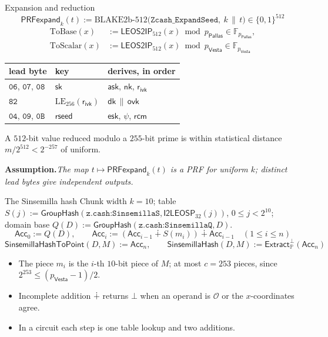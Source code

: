 \documentclass[aspectratio=169,11pt]{beamer}
\newcommand{\F}{\mathbb{F}}
\newcommand{\nksym}{\ensuremath{\mathsf{nk}}}
\newcommand{\asksym}{\ensuremath{\mathsf{ask}}}
\newcommand{\ovk}{\ensuremath{\mathsf{ovk}}}
\newcommand{\dk}{\ensuremath{\mathsf{dk}}}
\newcommand{\rcm}{\ensuremath{\mathsf{rcm}}}
\newcommand{\rivk}{\ensuremath{\mathsf{r_{ivk}}}}
\newcommand{\esk}{\ensuremath{\mathsf{esk}}}
\newcommand{\Extract}{\ensuremath{\mathsf{Extract}}}
\newcommand{\GroupHash}{\ensuremath{\mathsf{GroupHash}}}
\newcommand{\PP}{\mathbb{P}}
\newcommand{\pP}{p_{\mathsf{Pallas}}}
\newcommand{\pV}{p_{\mathsf{Vesta}}}
\newcommand{\FP}{\F_{\pP}}
\newcommand{\FV}{\F_{\pV}}
\newcommand{\Ext}{\Extract_{\PP}}
\newcommand{\sksym}{\mathsf{sk}}
\newcommand{\PRFx}[1]{\mathsf{PRFexpand}_{#1}}
\newcommand{\LE}[1]{\mathrm{LE}_{#1}}
\newcommand{\Ilep}[1]{\mathsf{I2LEOSP}_{#1}}
\newcommand{\SinHash}{\mathsf{SinsemillaHash}}
\newcommand{\SinPt}{\mathsf{SinsemillaHashToPoint}}
\newcommand{\rseed}{\mathsf{rseed}}
\newcommand{\stmt}[2]{\par\smallskip\noindent\textbf{#1}\enspace\textit{#2}\par}
\begin{document}
\begin{frame}{Expansion and reduction}
\[
\PRFx{k}(t) := \mathrm{BLAKE2b\text{-}512}\bigl(\texttt{Zcash\_ExpandSeed},\ k \,\|\, t\bigr) \in \{0,1\}^{512}
\]
\begin{align*}
\mathrm{ToBase}(x) &:= \mathsf{LEOS2IP}_{512}(x) \bmod \pP \in \FP, \\
\mathrm{ToScalar}(x) &:= \mathsf{LEOS2IP}_{512}(x) \bmod \pV \in \FV
\end{align*}
\vfill
\small
\begin{center}
\begin{tabular}{@{}lll@{}}
\toprule
lead byte & key & derives, in order \\
\midrule
$\mathtt{06}$, $\mathtt{07}$, $\mathtt{08}$ & $\sksym$ & $\asksym$, $\nksym$, $\rivk$ \\
$\mathtt{82}$ & $\LE{256}(\rivk)$ & $\dk \,\|\, \ovk$ \\
$\mathtt{04}$, $\mathtt{09}$, $\mathtt{0B}$ & $\rseed$ & $\esk$, $\psi$, $\rcm$ \\
\bottomrule
\end{tabular}
\end{center}
\vfill
A $512$-bit value reduced modulo a $255$-bit prime is within statistical
distance $m/2^{512} < 2^{-257}$ of uniform.
\stmt{Assumption.}{The map $t \mapsto \PRFx{k}(t)$ is a PRF for uniform $k$; distinct lead bytes give independent outputs.}
\end{frame}

\begin{frame}{The Sinsemilla hash}
Chunk width $k = 10$; table $S(j) := \GroupHash(\texttt{z.cash:SinsemillaS}, \Ilep{32}(j))$, $0 \le j < 2^{10}$;
domain base $Q(D) := \GroupHash(\texttt{z.cash:SinsemillaQ}, D)$.
\[
\mathsf{Acc}_0 := Q(D),\qquad
\mathsf{Acc}_i := (\mathsf{Acc}_{i-1} \dotplus S(m_i)) \dotplus \mathsf{Acc}_{i-1}
\quad (1 \le i \le n)
\]
\[
\SinPt(D, M) := \mathsf{Acc}_n,\qquad
\SinHash(D, M) := \Ext^{\bot}(\mathsf{Acc}_n)
\]
\vfill
\begin{itemize}\itemsep4pt
\item The piece $m_i$ is the $i$-th $10$-bit piece of $M$; at most $c = 253$ pieces, since $2^{253} \le (\pV - 1)/2$.
\item Incomplete addition $\dotplus$ returns $\bot$ when an operand is $\mathcal{O}$ or
  the $x$-coordinates agree.
\item In a circuit each step is one table lookup and two additions.
\end{itemize}
\end{frame}
\end{document}
